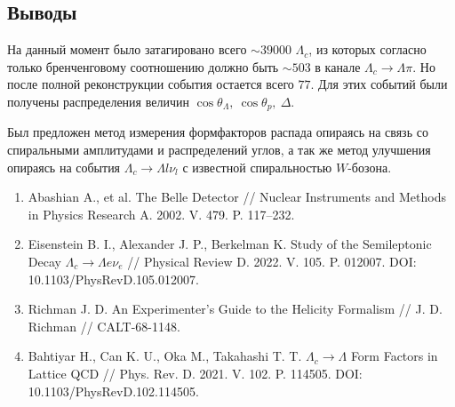 \documentclass[a0,portrait]{a0poster}
\newcommand\tab[1][0.51cm]{\hspace*{#1}}
\begin{document}
\begin{mdframed}[style=MyFrame]
\begin{multicols}{2}
\section{Выводы}
\tab На данный момент было затагировано всего $\sim 39000$ $\Lambda_c$, из которых согласно только 
бренченговому соотношению должно быть $\sim 503$ в канале $\Lambda_c \to \Lambda \pi$. 
Но после полной реконструкции события остается всего $77$. 
Для этих событий были получены распределения величин $\cos{\theta_\Lambda}, \ \cos{\theta_p}, \ \Delta$.

\tab Был предложен метод измерения формфакторов распада опираясь на связь со 
спиральными амплитудами и распределений углов, а так же метод улучшения опираясь 
на события $\Lambda_c \to \Lambda l \nu_l$ с известной спиральностью $W$-бозона.
\end{multicols}
\end{mdframed}

\begin{mdframed}[style=MyFrame]

\begin{enumerate}
    \item Abashian A., et al. The Belle Detector // Nuclear Instruments and Methods in Physics Research A. 2002. V. 479. P. 117–232.
    \item Eisenstein B. I., Alexander J. P., Berkelman K. Study of the Semileptonic Decay $\Lambda_c \rightarrow \Lambda e \nu_e$ // Physical Review D. 2022. V. 105. P. 012007. DOI: 10.1103/PhysRevD.105.012007.
    \item Richman J. D. An Experimenter’s Guide to the Helicity Formalism // J. D. Richman // CALT-68-1148.
    \item Bahtiyar H., Can K. U., Oka M., Takahashi T. T. $\Lambda_c \to \Lambda$ Form Factors in Lattice QCD // Phys. Rev. D. 2021. V. 102. P. 114505. DOI: 10.1103/PhysRevD.102.114505.    
\end{enumerate}

\end{mdframed}
\end{document}
